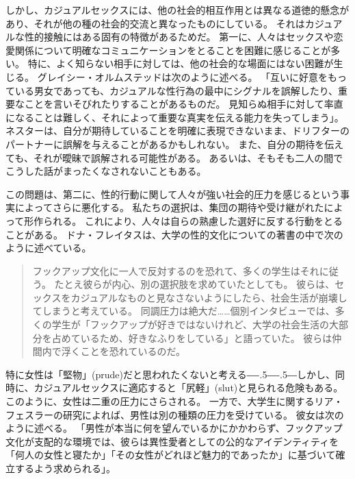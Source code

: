 \documentclass[paper=a4,book,openany]{jlreq}
\def\DDASH{―\kern-.5\zw―\kern-.5\zw―}
\begin{document}
しかし、カジュアルセックスには、他の社会的相互作用とは異なる道徳的懸念があり、それが他の種の社会的交流と異なったものにしている。
それはカジュアルな性的接触にはある固有の特徴があるためだ。
第一に、人々はセックスや恋愛関係について明確なコミュニケーションをとることを困難に感じることが多い。
特に、よく知らない相手に対しては、他の社会的な場面にはない困難が生じる。
グレイシー・オルムステッドは次のように述べる。
「互いに好意をもっている男女であっても、カジュアルな性行為の最中にシグナルを誤解したり、重要なことを言いそびれたりすることがあるものだ。
見知らぬ相手に対して率直になることは難しく、それによって重要な真実を伝える能力を失ってしまう」\citep{olmstead18:_divor_sex_love}。
ネスターは、自分が期待していることを明確に表現できないまま、ドリフターのパートナーに誤解を与えることがあるかもしれない。
また、自分の期待を伝えても、それが曖昧で誤解される可能性がある。
あるいは、そもそも二人の間でこうした話がまったくなされないこともある。

この問題は、第二に、性的行動に関して人々が強い社会的圧力を感じるという事実によってさらに悪化する。
私たちの選択は、集団の期待や受け継がれたによって形作られる。
これにより、人々は自らの熟慮した選好に反する行動をとることがある。
ドナ・フレイタスは、大学の性的文化についての著書の中で次のように述べている。

\begin{quote}
  フックアップ文化に一人で反対するのを恐れて、多くの学生はそれに従う。
たとえ彼らが内心、別の選択肢を求めていたとしても。
彼らは、セックスをカジュアルなものと見なさないようにしたら、社会生活が崩壊してしまうと考えている。
同調圧力は絶大だ……個別インタビューでは、多くの学生が「フックアップが好きではないけれど、大学の社会生活の大部分を占めているため、好きなふりをしている」と語っていた。
彼らは仲間内で浮くことを恐れているのだ。
\citep{freitas13:_time_stop_hook_up}

\end{quote}

特に女性は「堅物」(prude)だと思われたくないと考える{\DDASH}しかし、同時に、カジュアルセックスに適応すると「尻軽」(slut)と見られる危険もある。
このように、女性は二重の圧力にさらされる。
一方で、大学生に関するリア・フェスラーの研究によれば、男性は別の種類の圧力を受けている。
彼女は次のように述べる。
「男性が本当に何を望んでいるかにかかわらず、フックアップ文化が支配的な環境では、彼らは異性愛者としての公的なアイデンティティを「何人の女性と寝たか」「その女性がどれほど魅力的であったか」に基づいて確立するよう求められる」\citep{fessler16:_lot_women_dont}。
\end{document}
